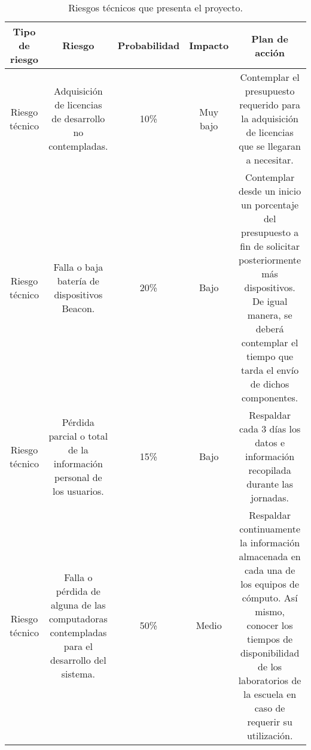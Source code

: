 \begin{table}[htb]
\setlength\extrarowheight{2pt} %
\begin{tabularx}{\textwidth}{|C|C|C|C|C|}
\hline
\textbf{Tipo de riesgo} & \textbf{Riesgo} & \textbf{Probabilidad}  & \textbf{Impacto}  & \textbf{Plan de acción}
\\ \hline
Riesgo técnico & Adquisición de licencias de desarrollo no contempladas. & 10\% & Muy bajo & Contemplar el presupuesto requerido para la adquisición de licencias que se llegaran a necesitar.
\\ \hline
Riesgo técnico & Falla o baja batería de dispositivos Beacon. & 20\% & Bajo & Contemplar desde un inicio un porcentaje del presupuesto a fin de solicitar posteriormente más dispositivos. De igual manera, se deberá contemplar el tiempo que tarda el envío de dichos componentes.
\\ \hline
Riesgo técnico & Pérdida parcial o total de la información personal de los usuarios. & 15\% & Bajo & Respaldar cada 3 días los datos e información recopilada durante las jornadas.
\\ \hline
Riesgo técnico & Falla o pérdida de alguna de las computadoras contempladas para el desarrollo del sistema. & 50\% & Medio & Respaldar continuamente la información almacenada en cada una de los equipos de cómputo. Así mismo, conocer los tiempos de disponibilidad de los laboratorios de la escuela en caso de requerir su utilización.
\\ \hline 
\end{tabularx}
\caption{Riesgos técnicos que presenta el proyecto.}
\label{table:riesgostecnicos}
\end{table}
\FloatBarrier
